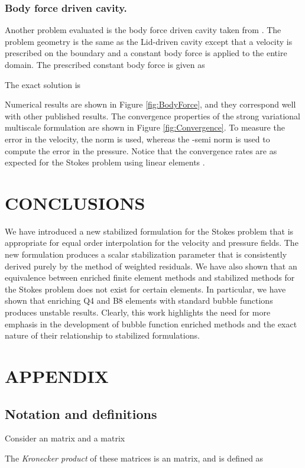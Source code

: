 \documentclass[11pt]{amsart}
\begin{document}
\subsubsection{Body force driven cavity.}
Another problem evaluated is the body force driven cavity taken from \cite{Donea}.  The problem geometry is the same as the Lid-driven cavity except that a velocity  is prescribed on the boundary and a constant body force is applied to the entire domain.  The prescribed constant body force is given as

The exact solution is

Numerical results are shown in Figure \ref{fig:BodyForce}, and they correspond well with other published results.  The convergence properties of the strong variational multiscale formulation are shown in Figure \ref{fig:Convergence}.  To measure the error in the velocity, the  norm is used, whereas the -semi norm is used to compute the error in the pressure.  Notice that the convergence rates are as expected for the Stokes problem using linear elements \cite{PSPG}.


% 

\section{CONCLUSIONS}
We have introduced a new stabilized formulation for the Stokes problem that is appropriate for equal order interpolation for the velocity and pressure fields.  The new formulation produces a scalar stabilization parameter that is consistently derived purely by the method of weighted residuals. We have also shown that an equivalence between enriched finite element methods and stabilized methods for the Stokes problem does not exist for certain elements.  In particular, we have shown that enriching Q4 and B8 elements with standard bubble functions produces unstable results.  Clearly, this work highlights the need for more emphasis in the development of bubble function enriched methods and the exact nature of their relationship to stabilized formulations.
 \section*{APPENDIX}
\subsection*{ Notation and definitions}
Consider an  matrix  and a  matrix 

The \emph{Kronecker product} of these matrices is an  matrix, and is defined as
\end{document}
